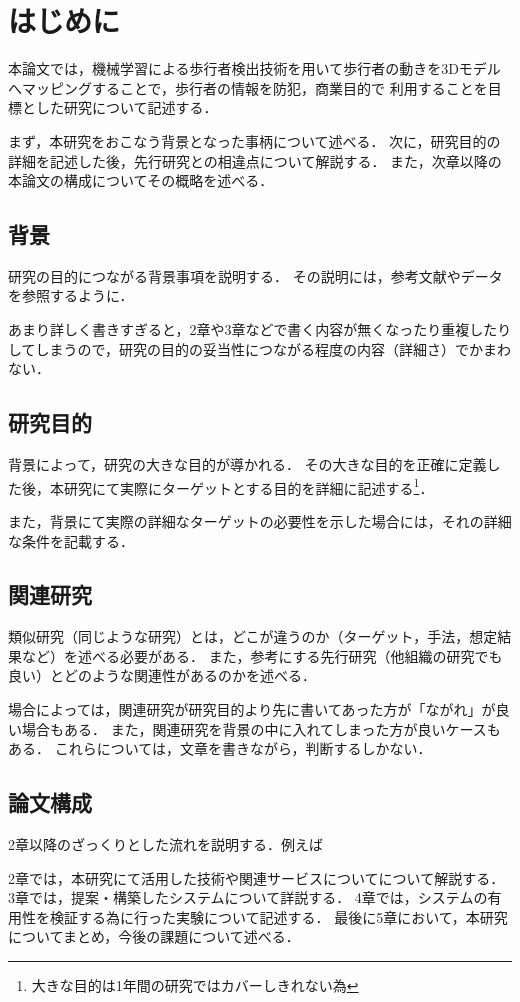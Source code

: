\chapter{はじめに}
本論文では，機械学習による歩行者検出技術を用いて歩行者の動きを3Dモデルへマッピングすることで，歩行者の情報を防犯，商業目的で
利用することを目標とした研究について記述する．

まず，本研究をおこなう背景となった事柄について述べる．
次に，研究目的の詳細を記述した後，先行研究との相違点について解説する．
また，次章以降の本論文の構成についてその概略を述べる．

\section{背景}
研究の目的につながる背景事項を説明する．
その説明には，参考文献やデータを参照するように．

あまり詳しく書きすぎると，2章や3章などで書く内容が無くなったり重複したりしてしまうので，研究の目的の妥当性につながる程度の内容（詳細さ）でかまわない．

\section{研究目的}
背景によって，研究の大きな目的が導かれる．
その大きな目的を正確に定義した後，本研究にて実際にターゲットとする目的を詳細に記述する\footnote{大きな目的は1年間の研究ではカバーしきれない為}．

また，背景にて実際の詳細なターゲットの必要性を示した場合には，それの詳細な条件を記載する．

\section{関連研究}
類似研究（同じような研究）とは，どこが違うのか（ターゲット，手法，想定結果など）を述べる必要がある．
また，参考にする先行研究（他組織の研究でも良い）とどのような関連性があるのかを述べる．

場合によっては，関連研究が研究目的より先に書いてあった方が「ながれ」が良い場合もある．
また，関連研究を背景の中に入れてしまった方が良いケースもある．
これらについては，文章を書きながら，判断するしかない．

\section{論文構成}
2章以降のざっくりとした流れを説明する．例えば

2章では，本研究にて活用した技術や関連サービスについてについて解説する．
3章では，提案・構築したシステムについて詳説する．
4章では，システムの有用性を検証する為に行った実験について記述する．
最後に5章において，本研究についてまとめ，今後の課題について述べる．


